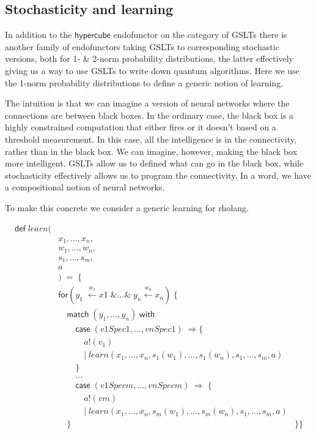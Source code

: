 \documentclass{article}
\begin{document}
\subsection{Stochasticity and learning}

In addition to the $\mathsf{hypercube}$ endofunctor on the category of
GSLTs there is another family of endofunctors taking GSLTs to
corresponding stochastic versions, both for 1- \& 2-norm probability
distributions, the latter effectively giving us a way to use GSLTs to
write down quantum algorithms. Here we use the 1-norm probability
distributions to define a generic notion of learning.

The intuition is that we can imagine a version of neural networks
where the connections are between black boxes. In the ordinary case,
the black box is a highly constrained computation that either fires or
it doesn't based on a threshold measurement. In this case, all the
intelligence is in the connectivity, rather than in the black box. We
can imagine, however, making the black box more intelligent. GSLTs
allow us to defined what can go in the black box, while stochasticity
effectively allows us to program the connectivity. In a word, we have
a compositional notion of neural networks.

To make this concrete we consider a generic learning for rholang.

\begin{align*}
  \mathsf{def}\; learn( \\
  & x_1, \ldots, x_n, \\
  & w_1, \ldots, w_n, \\
  & s_1, \ldots, s_m, \\
  & a \\
  & )\; = \; \{ \\
   &\mathsf{for}( y_1 \;\overset{w_1}{\leftarrow} x1\; \& \ldots \&\; y_n \overset{w_n} \leftarrow x_n )\;\{\;  \\
      &\quad \mathsf{match}\; ( y_1, \ldots, y_n )\; \mathsf{with} \\
         &\quad\quad \mathsf{case}\; ( v1Spec1, \ldots, vnSpec1 )\; \Rightarrow \{ \\
            &\quad\quad\quad a\mathsf{!}( v_1 ) \\
            &\quad\quad\quad |\; learn( x_1, \ldots, x_n, s_1( w_1 ), \ldots, s_1( w_n ), s_1, \ldots, s_m, a ) \\
         &\quad\quad \} \\
         &\quad\quad \ldots \\
         &\quad\quad \mathsf{case}\; ( v1Specm, …, vnSpecm ) \; \Rightarrow \; \{ \\
            &\quad\quad\quad a\mathsf{!}( vm ) \\
            &\quad\quad\quad |\; learn( x_1, \ldots, x_n, s_m( w_1 ), \ldots, s_m( w_n ), s_1, \ldots, s_m, a ) \\
         &\quad \}
   &\}
\}
\end{align*}
\end{document}
